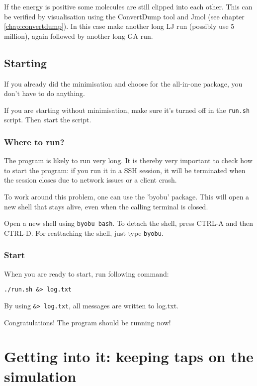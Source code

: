 If the energy is positive some molecules are still clipped into each other. 
This can be verified by visualisation using the ConvertDump tool and Jmol (see 
chapter 
\ref{chap:convertdump}).
In this case make another long LJ run (possibly use 5 million), again followed 
by another long GA run.

\section{Starting}
If you already did the minimisation and choose for the all-in-one package, you 
don't have to do anything.

If you are starting without minimisation, make sure it's turned off in the 
\verb|run.sh| script. Then start the script.

\subsection{Where to run?}
The program is likely to run very long. It is thereby very important to check 
how to start the program: if you run it in a SSH session, it will be terminated 
when the session closes due to network issues or a client crash.

To work around this problem, one can use the 'byobu' package. This will open a 
new shell that stays alive, even when the calling terminal is closed. 

Open a new shell using \verb|byobu bash|. To detach the shell, press CTRL-A and 
then CTRL-D. For reattaching the shell, just type \verb|byobu|.


\subsection{Start}\label{subs:start}
When you are ready to start, run following command:

\begin{lstlisting}[caption=runmin]
./run.sh &> log.txt
\end{lstlisting}

By using \verb|&> log.txt|, all messages are written to log.txt.

Congratulations! The program should be running now!
		
	\chapter{Getting into it: keeping taps on the simulation}

